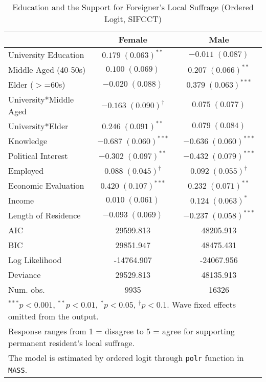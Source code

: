 
\begin{table}
\caption{Education and the Support for Foreigner's Local Suffrage (Ordered Logit, SIFCCT)}
\begin{center}
\begin{tabular}{l c c }
\toprule
 & Female & Male \\
\midrule
University Education   & $0.179 \; (0.063)^{**}$       & $-0.011 \; (0.087)$          \\
Middle Aged (40-50s)   & $0.100 \; (0.069)$            & $0.207 \; (0.066)^{**}$      \\
Elder ($>$=60s)        & $-0.020 \; (0.088)$           & $0.379 \; (0.063)^{***}$     \\
University*Middle Aged & $-0.163 \; (0.090)^{\dagger}$ & $0.075 \; (0.077)$           \\
University*Elder       & $0.246 \; (0.091)^{**}$       & $0.079 \; (0.084)$           \\
Knowledge              & $-0.687 \; (0.060)^{***}$     & $-0.636 \; (0.060)^{***}$    \\
Political Interest     & $-0.302 \; (0.097)^{**}$      & $-0.432 \; (0.079)^{***}$    \\
Employed               & $0.088 \; (0.045)^{\dagger}$  & $0.092 \; (0.055)^{\dagger}$ \\
Economic Evaluation    & $0.420 \; (0.107)^{***}$      & $0.232 \; (0.071)^{**}$      \\
Income                 & $0.010 \; (0.061)$            & $0.124 \; (0.063)^{*}$       \\
Length of Residence    & $-0.093 \; (0.069)$           & $-0.237 \; (0.058)^{***}$    \\
\midrule
AIC                    & 29599.813                     & 48205.913                    \\
BIC                    & 29851.947                     & 48475.431                    \\
Log Likelihood         & -14764.907                    & -24067.956                   \\
Deviance               & 29529.813                     & 48135.913                    \\
Num. obs.              & 9935                          & 16326                        \\
\bottomrule
\multicolumn{3}{l}{\scriptsize{$^{***}p<0.001$, $^{**}p<0.01$, $^*p<0.05$, $^{\dagger}p<0.1$. Wave fixed effects omitted from the output.}} \\ \multicolumn{3}{l}{\scriptsize{Response ranges from 1 = disagree to 5 = agree for supporting permanent resident's local suffrage.}} \\ \multicolumn{3}{l}{\scriptsize{The model is estimated by ordered logit through \texttt{polr} function in \texttt{MASS}.}}
\end{tabular}
\label{oltab_smo}
\end{center}
\end{table}

